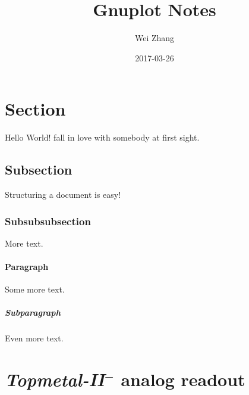 \documentclass[18pt]{article}
\title{Gnuplot Notes}
\date{2017-03-26}
\author{Wei Zhang}
\begin{document}
\maketitle
\newpage

\section{Section}

Hello World! fall in love with somebody at first sight.

\subsection{Subsection}

Structuring a document is easy!

\subsubsection{Subsubsubsection}

More text.

\paragraph{Paragraph}

Some more text.

\subparagraph{Subparagraph}

Even more text.

\section{\emph{Topmetal-II$^-$} analog readout}
\end{document}
